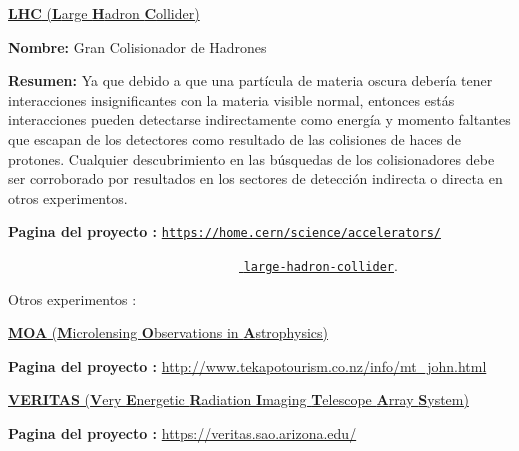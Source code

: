 \begin{itemize_f}
\item[-] \href{https://en.wikipedia.org/wiki/Large_Hadron_Collider}{\textbf{LHC} (\textbf{L}arge \textbf{H}adron \textbf{C}ollider)}
\begin{itemize_f}\label{lhc}
\item \textbf{Nombre:} Gran Colisionador de Hadrones
\item \textbf{Resumen:} Ya que debido a que una partícula de materia oscura debería tener interacciones insignificantes con la materia visible normal, entonces estás interacciones pueden detectarse indirectamente como energía y momento faltantes que escapan de los detectores como resultado de las colisiones de haces de protones. Cualquier descubrimiento en las búsquedas de los colisionadores debe ser corroborado por resultados en los sectores de detección indirecta o directa en otros experimentos.
\item \textbf{Pagina del proyecto :} \href{https://home.cern/science/accelerators/large-hadron-collider}{\texttt{https://home.cern/science/accelerators/}}

~~~~~~~~~~~~~~~~~~~~~~~~~~~~~~~~~\href{https://home.cern/science/accelerators/large-hadron-collider}{ \texttt{large-hadron-collider}}. %
\end{itemize_f}


\item[-] Otros experimentos : 
\begin{itemize_f}
\item[-] \href{https://en.wikipedia.org/wiki/Microlensing_Observations_in_Astrophysics}{\textbf{MOA} (\textbf{M}icrolensing \textbf{O}bservations in \textbf{A}strophysics) }

\textbf{Pagina del proyecto :} \url{http://www.tekapotourism.co.nz/info/mt_john.html}

\item[-] \href{https://en.wikipedia.org/wiki/VERITAS}{\textbf{VERITAS} (\textbf{V}ery \textbf{E}nergetic \textbf{R}adiation \textbf{I}maging \textbf{T}elescope \textbf{A}rray \textbf{S}ystem)}

\textbf{Pagina del proyecto :} \url{https://veritas.sao.arizona.edu/}
\end{itemize_f}


\end{itemize_f}



